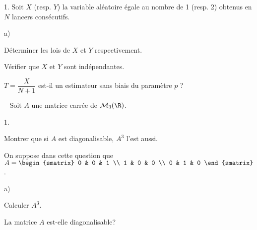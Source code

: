 \documentclass[11pt]{article}%
\begin{document}
\begin{exerciceAP}
\begin{noliste}{1.}
    Soit $X$ (resp. $Y$) la variable aléatoire égale au nombre de 1
    (resp. 2) obtenus en $N$ lancers consécutifs. 
    \begin{noliste}{a)}
    \setlength{\itemsep}{2mm}
    \item Déterminer les lois de $X$ et $Y$ respectivement.
    \item Vérifier que $X$ et $Y$ sont indépendantes.
    \item $T = \dfrac{ X }{ N + 1 }$ est-il un estimateur sans biais du
      paramètre $p$ ?
    \end{noliste}
  \end{noliste}
\end{exerciceAP}


\begin{exerciceSP}~
  Soit $A$ une matrice carrée de $\mathcal{M}_3 ( \R ) $.
  \begin{noliste}{1.}
    \setlength{\itemsep}{2mm}
  \item Montrer que si $A$ est diagonalisable, $A^3$ l'est aussi.
  \item On suppose dans cette question que $A = 
    \begin{smatrix} 
      0 & 0 & 1 \\ 
      1 & 0 & 0 \\ 
      0 & 1 & 0 
    \end{smatrix}$. 
    \begin{noliste}{a)}
    \setlength{\itemsep}{2mm}
    \item Calculer $A^3$.
    \item La matrice $A$ est-elle diagonalisable?
    \end{noliste}
  \end{noliste}
\end{exerciceSP}


\newpage
\end{document}
